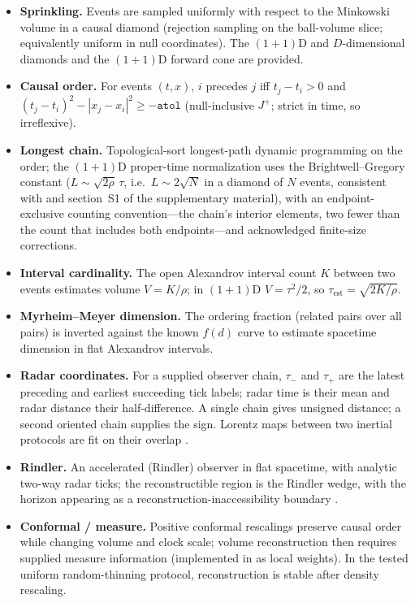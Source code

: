 \begin{itemize}
\item \textbf{Sprinkling.} Events are sampled uniformly with respect to the
  Minkowski volume in a causal diamond (rejection sampling on the
  ball-volume slice; equivalently uniform in null coordinates). The
  $(1{+}1)$D and $D$-dimensional diamonds and the $(1{+}1)$D forward cone
  are provided.
\item \textbf{Causal order.} For events $(t, x)$, $i$ precedes $j$ iff
  $t_j - t_i > 0$ and $(t_j - t_i)^2 - |x_j - x_i|^2 \ge -\texttt{atol}$
  (null-inclusive $J^+$; strict in time, so irreflexive).
\item \textbf{Longest chain.} Topological-sort longest-path dynamic
  programming on the order; the $(1{+}1)$D proper-time normalization uses
  the Brightwell--Gregory constant ($L \sim \sqrt{2\rho}\,\tau$, i.e.\
  $L \sim 2\sqrt{N}$ in a diamond of $N$ events, consistent with
  \sref{sec:r1} and section~S1 of the supplementary material), with an
  endpoint-exclusive counting convention---the chain's interior elements,
  two fewer than the count that includes both endpoints---and acknowledged
  finite-size corrections.
\item \textbf{Interval cardinality.} The open Alexandrov interval count $K$
  between two events estimates volume $V = K/\rho$; in $(1{+}1)$D
  $V = \tau^2/2$, so $\tau_{\mathrm{est}} = \sqrt{2K/\rho}$.
\item \textbf{Myrheim--Meyer dimension.} The ordering fraction (related
  pairs over all pairs) is inverted against the known $f(d)$ curve to
  estimate spacetime dimension in flat Alexandrov intervals.
\item \textbf{Radar coordinates.} For a supplied observer chain, $\tau_-$
  and $\tau_+$ are the latest preceding and earliest succeeding tick
  labels; radar time is their mean and radar distance their
  half-difference. A single chain gives unsigned distance; a second
  oriented chain supplies the sign. Lorentz maps between two inertial
  protocols are fit on their overlap \cite{perlick2008}.
\item \textbf{Rindler.} An accelerated (Rindler) observer in flat
  spacetime, with analytic two-way radar ticks; the reconstructible region
  is the Rindler wedge, with the horizon appearing as a
  reconstruction-inaccessibility boundary \cite{rindler1966}.
\item \textbf{Conformal / measure.} Positive conformal rescalings preserve
  causal order while changing volume and clock scale; volume reconstruction
  then requires supplied measure information (implemented in \expid{exp19}
  as local weights). In the tested uniform random-thinning protocol, reconstruction
  is stable after density rescaling.
\end{itemize}
